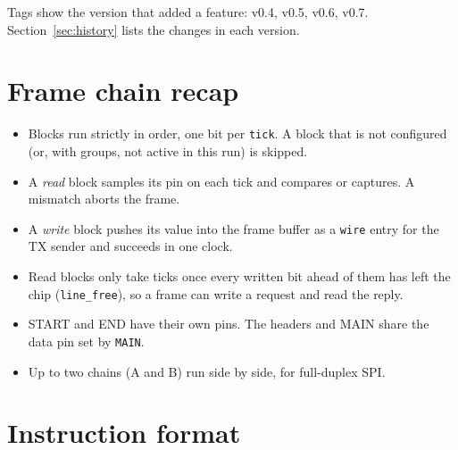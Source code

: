 \documentclass[11pt,a4paper]{article}
\newcommand{\new}{\textcolor{newc}{\textsf{\small v0.4}}}
\newcommand{\vfive}{\textcolor{fivec}{\textsf{\small v0.5}}}
\newcommand{\vsix}{\textcolor{sixc}{\textsf{\small v0.6}}}
\newcommand{\vseven}{\textcolor{sevenc}{\textsf{\small v0.7}}}
\newcommand{\sig}[1]{\texttt{#1}}
\begin{document}
Tags show the version that added a feature: \new, \vfive, \vsix, \vseven. Section~\ref{sec:history} lists the changes in each version.

\section{Frame chain recap}

\begin{center}
\end{center}

\begin{itemize}
\item Blocks run strictly in order, one bit per \sig{tick}. A block that is not configured (or, with groups, not active in this run) is skipped.
\item A \emph{read} block samples its pin on each tick and compares or captures. A mismatch aborts the frame.
\item A \emph{write} block pushes its value into the frame buffer as a \sig{wire} entry for the TX sender and succeeds in one clock.
\item Read blocks only take ticks once every written bit ahead of them has left the chip (\sig{line\_free}), so a frame can write a request and read the reply.
\item START and END have their own pins. The headers and MAIN share the data pin set by \sig{MAIN}.
\item Up to two chains (A and B) run side by side, for full-duplex SPI.
\end{itemize}

\section{Instruction format}
\end{document}
